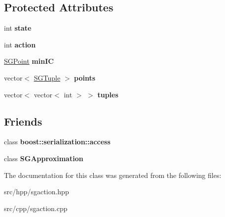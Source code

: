 \subsection*{Protected Attributes}
\begin{DoxyCompactItemize}
\item 
\hypertarget{class_s_g_action_a1ad4ae3feb4e3ec46e21273dd51a6004}{int {\bfseries state}}\label{class_s_g_action_a1ad4ae3feb4e3ec46e21273dd51a6004}

\item 
\hypertarget{class_s_g_action_a65c62a3804b50febd9a289f3d8902f85}{int {\bfseries action}}\label{class_s_g_action_a65c62a3804b50febd9a289f3d8902f85}

\item 
\hypertarget{class_s_g_action_a20b96be3274e3cd2bc1be0d218fc2b06}{\hyperlink{class_s_g_point}{S\+G\+Point} {\bfseries min\+I\+C}}\label{class_s_g_action_a20b96be3274e3cd2bc1be0d218fc2b06}

\item 
\hypertarget{class_s_g_action_a8860ada2cacece1a8feed794d81d9e9f}{vector$<$ \hyperlink{class_s_g_tuple}{S\+G\+Tuple} $>$ {\bfseries points}}\label{class_s_g_action_a8860ada2cacece1a8feed794d81d9e9f}

\item 
\hypertarget{class_s_g_action_a60599bc5a745db1557191a61c0db28b3}{vector$<$ vector$<$ int $>$ $>$ {\bfseries tuples}}\label{class_s_g_action_a60599bc5a745db1557191a61c0db28b3}

\end{DoxyCompactItemize}
\subsection*{Friends}
\begin{DoxyCompactItemize}
\item 
\hypertarget{class_s_g_action_ac98d07dd8f7b70e16ccb9a01abf56b9c}{class {\bfseries boost\+::serialization\+::access}}\label{class_s_g_action_ac98d07dd8f7b70e16ccb9a01abf56b9c}

\item 
\hypertarget{class_s_g_action_adaa41c100279e40c34d42b18d0c2ed21}{class {\bfseries S\+G\+Approximation}}\label{class_s_g_action_adaa41c100279e40c34d42b18d0c2ed21}

\end{DoxyCompactItemize}


The documentation for this class was generated from the following files\+:\begin{DoxyCompactItemize}
\item 
src/hpp/sgaction.\+hpp\item 
src/cpp/sgaction.\+cpp\end{DoxyCompactItemize}
